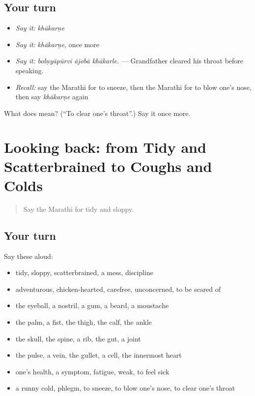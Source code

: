 \subsection*{Your turn}
\begin{itemize}
\raggedright
  \item \emph{Say it:} \emph{khākarṇe}
  \item \emph{Say it:} \emph{khākarṇe}, once more
  \item \emph{Say it:} \emph{bolṇyāpūrvī ājobā khākarle.} — Grandfather cleared his throat before speaking.
  \item \emph{Recall:} say the Marathi for to sneeze, then the Marathi for to blow one's nose, then say \emph{khākarṇe} again
\end{itemize}

\begin{tcolorbox}[breakable,colback=teal!4,colframe=teal!35!black,title={Before you move on}]
What does  mean? (\textquotedblleft{}To clear one's throat\textquotedblright{}.) Say it once more.
\end{tcolorbox}
\section[(dialogue)]{Looking back: from Tidy and Scatterbrained to Coughs and Colds}

\label{lesson:MR-R481-review-474-481}



\begin{quote}
Say the Marathi for tidy and sloppy.
\end{quote}

\subsection*{Your turn}
Say these aloud:

\begin{itemize}
\raggedright
  \item tidy, sloppy, scatterbrained, a mess, discipline
  \item adventurous, chicken-hearted, carefree, unconcerned, to be scared of
  \item the eyeball, a nostril, a gum, a beard, a moustache
  \item the palm, a fist, the thigh, the calf, the ankle
  \item the skull, the spine, a rib, the gut, a joint
  \item the pulse, a vein, the gullet, a cell, the innermost heart
  \item one's health, a symptom, fatigue, weak, to feel sick
  \item a runny cold, phlegm, to sneeze, to blow one's nose, to clear one's throat
\end{itemize}

